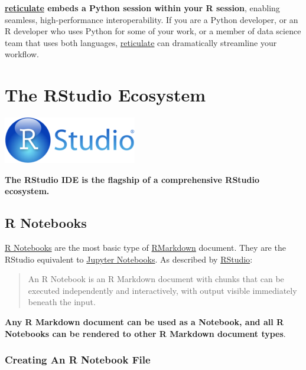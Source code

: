 \documentclass[]{book}
\theoremstyle{definition}
\theoremstyle{definition}
\theoremstyle{definition}
\theoremstyle{remark}
\begin{document}
\textbf{\href{https://rstudio.github.io/reticulate/index.html}{reticulate}
embeds a Python session within your R session}, enabling seamless,
high-performance interoperability. If you are a Python developer, or an
R developer who uses Python for some of your work, or a member of data
science team that uses both languages,
\href{https://rstudio.github.io/reticulate/index.html}{reticulate} can
dramatically streamline your workflow.

\hypertarget{the-rstudio-ecosystem}{%
\chapter{The RStudio Ecosystem}\label{the-rstudio-ecosystem}}

\includegraphics{images/RStudio_full_logo.png}

\textbf{The RStudio IDE is the flagship of a comprehensive RStudio
ecosystem.}

\hypertarget{r-notebooks}{%
\section{R Notebooks}\label{r-notebooks}}

\href{https://rmarkdown.rstudio.com/r_notebooks.html}{R Notebooks} are
the most basic type of \protect\hyperlink{rmarkdown}{RMarkdown}
document. They are the RStudio equivalent to
\href{https://jupyter.org/}{Jupyter Notebooks}. As described by
\href{https://rmarkdown.rstudio.com/r_notebooks.html}{RStudio}:

\begin{quote}
An R Notebook is an R Markdown document with chunks that can be executed
independently and interactively, with output visible immediately beneath
the input.
\end{quote}

\textbf{Any R Markdown document can be used as a Notebook, and all R
Notebooks can be rendered to other R Markdown document types}.

\hypertarget{creating-an-r-notebook-file}{%
\subsection{Creating An R Notebook
File}\label{creating-an-r-notebook-file}}
\end{document}
